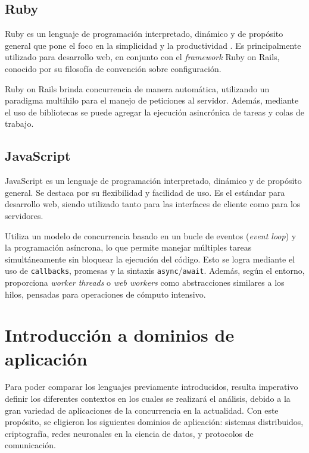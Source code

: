 \documentclass[11pt]{article}
\let\Oldsection\section
\renewcommand{\section}{\FloatBarrier\Oldsection}
\let\Oldsubsection\subsection
\renewcommand{\subsection}{\FloatBarrier\Oldsubsection}
\newcommand{\english}[1]{\textit{#1}}
\begin{document}
\subsection{Ruby}

Ruby es un lenguaje de programación interpretado, dinámico y de propósito general que pone el foco en la simplicidad y la productividad \cite{com:ruby}. Es principalmente utilizado para desarrollo web, en conjunto con el \english{framework} Ruby on Rails, conocido por su filosofía de convención sobre configuración.

Ruby on Rails brinda concurrencia de manera automática, utilizando un paradigma multihilo para el manejo de peticiones al servidor. Además, mediante el uso de bibliotecas se puede agregar la ejecución asincrónica de tareas y colas de trabajo.

\subsection{JavaScript}

JavaScript es un lenguaje de programación interpretado, dinámico y de propósito general. Se destaca por su flexibilidad y facilidad de uso. Es el estándar para desarrollo web, siendo utilizado tanto para las interfaces de cliente como para los servidores.

Utiliza un modelo de concurrencia basado en un bucle de eventos (\english{event loop}) y la programación asíncrona, lo que permite manejar múltiples tareas simultáneamente sin bloquear la ejecución del código. Esto se logra mediante el uso de \lstinline{callbacks}, promesas y la sintaxis \lstinline{async}/\lstinline{await}. Además, según el entorno, proporciona \english{worker threads} o \english{web workers} como abstracciones similares a los hilos, pensadas para operaciones de cómputo intensivo.

\newpage %

\section{Introducción a dominios de aplicación}

Para poder comparar los lenguajes previamente introducidos, resulta imperativo definir los diferentes contextos en los cuales se realizará el análisis, debido a la gran variedad de aplicaciones de la concurrencia en la actualidad. Con este propósito, se eligieron los siguientes dominios de aplicación: sistemas distribuidos, criptografía, redes neuronales en la ciencia de datos, y protocolos de comunicación.
\end{document}
